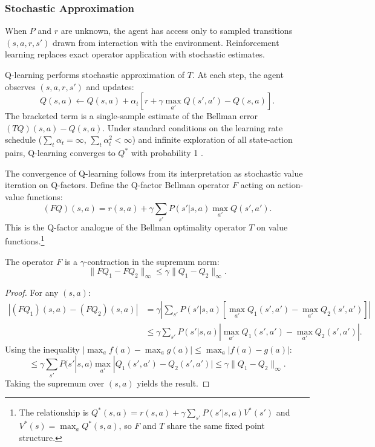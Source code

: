 \subsubsection{Stochastic Approximation}

When $P$ and $r$ are unknown, the agent has access only to sampled transitions $(s, a, r, s')$ drawn from interaction with the environment. Reinforcement learning replaces exact operator application with stochastic estimates.

Q-learning \citep{watkins1992_paper} performs stochastic approximation of $T$. At each step, the agent observes $(s, a, r, s')$ and updates:
\begin{equation}
Q(s,a) \leftarrow Q(s,a) + \alpha_t \left[ r + \gamma \max_{a'} Q(s',a') - Q(s,a) \right].
\label{eq:q_learning}
\end{equation}
The bracketed term is a single-sample estimate of the Bellman error $(TQ)(s,a) - Q(s,a)$. Under standard conditions on the learning rate schedule ($\sum_t \alpha_t = \infty$, $\sum_t \alpha_t^2 < \infty$) and infinite exploration of all state-action pairs, Q-learning converges to $Q^*$ with probability 1 \citep{watkins1992_paper}.

The convergence of Q-learning follows from its interpretation as stochastic value iteration on Q-factors. Define the Q-factor Bellman operator $F$ acting on action-value functions:
\begin{equation}
(FQ)(s,a) = r(s,a) + \gamma \sum_{s'} P(s'|s,a) \max_{a'} Q(s',a').
\label{eq:q_factor_bellman}
\end{equation}
This is the Q-factor analogue of the Bellman optimality operator $T$ on value functions.\footnote{The relationship is $Q^*(s,a) = r(s,a) + \gamma \sum_{s'} P(s'|s,a) V^*(s')$ and $V^*(s) = \max_a Q^*(s,a)$, so $F$ and $T$ share the same fixed point structure.}

\begin{theorem}
\label{thm:q_factor_contraction}
The operator $F$ is a $\gamma$-contraction in the supremum norm:
\[
\|FQ_1 - FQ_2\|_\infty \leq \gamma \|Q_1 - Q_2\|_\infty.
\]
\end{theorem}

\begin{proof}
For any $(s,a)$:
\begin{align*}
|(FQ_1)(s,a) - (FQ_2)(s,a)| &= \gamma \left| \sum_{s'} P(s'|s,a) \left[ \max_{a'} Q_1(s',a') - \max_{a'} Q_2(s',a') \right] \right| \\
&\leq \gamma \sum_{s'} P(s'|s,a) \left| \max_{a'} Q_1(s',a') - \max_{a'} Q_2(s',a') \right|.
\end{align*}
Using the inequality $|\max_a f(a) - \max_a g(a)| \leq \max_a |f(a) - g(a)|$:
\[
\leq \gamma \sum_{s'} P(s'|s,a) \max_{a'} |Q_1(s',a') - Q_2(s',a')| \leq \gamma \|Q_1 - Q_2\|_\infty.
\]
Taking the supremum over $(s,a)$ yields the result.
\end{proof}

